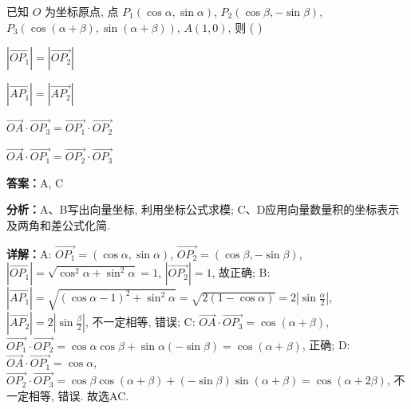 \begin{question}[points=5]
已知 $O$ 为坐标原点, 点 $P_1(\cos\alpha, \sin\alpha)$, $P_2(\cos\beta, -\sin\beta)$, $P_3(\cos(\alpha+\beta), \sin(\alpha+\beta))$, $A(1,0)$, 则 ( )
\begin{choices}
  \item $|\overrightarrow{OP_1}| = |\overrightarrow{OP_2}|$
  \item $|\overrightarrow{AP_1}| = |\overrightarrow{AP_2}|$
  \item $\overrightarrow{OA} \cdot \overrightarrow{OP_3} = \overrightarrow{OP_1} \cdot \overrightarrow{OP_2}$
  \item $\overrightarrow{OA} \cdot \overrightarrow{OP_1} = \overrightarrow{OP_2} \cdot \overrightarrow{OP_3}$
\end{choices}
\begin{solution}
\textbf{答案：}A, C

\textbf{分析：}A、B写出向量坐标, 利用坐标公式求模; C、D应用向量数量积的坐标表示及两角和差公式化简.

\textbf{详解：}A: $\overrightarrow{OP_1} = (\cos\alpha, \sin\alpha)$, $\overrightarrow{OP_2} = (\cos\beta, -\sin\beta)$, $|\overrightarrow{OP_1}| = \sqrt{\cos^2\alpha + \sin^2\alpha} = 1$, $|\overrightarrow{OP_2}| = 1$, 故正确; B: $|\overrightarrow{AP_1}| = \sqrt{(\cos\alpha-1)^2 + \sin^2\alpha} = \sqrt{2(1-\cos\alpha)} = 2|\sin\frac{\alpha}{2}|$, $|\overrightarrow{AP_2}| = 2|\sin\frac{\beta}{2}|$, 不一定相等, 错误; C: $\overrightarrow{OA} \cdot \overrightarrow{OP_3} = \cos(\alpha+\beta)$, $\overrightarrow{OP_1} \cdot \overrightarrow{OP_2} = \cos\alpha\cos\beta + \sin\alpha(-\sin\beta) = \cos(\alpha+\beta)$, 正确; D: $\overrightarrow{OA} \cdot \overrightarrow{OP_1} = \cos\alpha$, $\overrightarrow{OP_2} \cdot \overrightarrow{OP_3} = \cos\beta\cos(\alpha+\beta) + (-\sin\beta)\sin(\alpha+\beta) = \cos(\alpha+2\beta)$, 不一定相等, 错误. 故选AC.
\end{solution}
\end{question}

